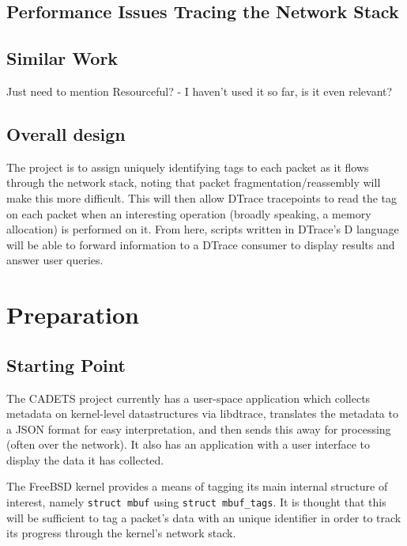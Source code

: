 \documentclass[a4paper,12pt,twoside,openright]{report}
\begin{document}
	\section{Performance Issues Tracing the Network Stack}
	
	
	
	\section{Similar Work}
	
	Just need to mention Resourceful? - I haven't used it so far, is it even relevant?
	
	\section{Overall design}
	
	The project is to assign uniquely identifying tags to each packet as it flows through the network stack, noting that packet fragmentation/reassembly will make this more difficult. This will then allow DTrace tracepoints to read the tag on each packet when an interesting operation (broadly speaking, a memory allocation) is performed on it. From here, scripts written in DTrace's D language will be able to forward information to a DTrace consumer to display results and answer user queries.

	
	
	\chapter{Preparation}
	
	\section{Starting Point}
	
	The CADETS project currently has a user-space application which collects metadata on kernel-level	datastructures via libdtrace, translates the metadata to a JSON format for easy interpretation, and	then sends this away for processing (often over the network). It also has an application with a user interface to display the data it has collected.
	
	The FreeBSD kernel provides a means of tagging its main internal structure of interest, namely \verb|struct mbuf| using \verb|struct mbuf_tags|. It is thought that this will be sufficient to tag a packet’s data with an unique identifier in order to track its progress through the kernel’s network stack.
	
\end{document}
